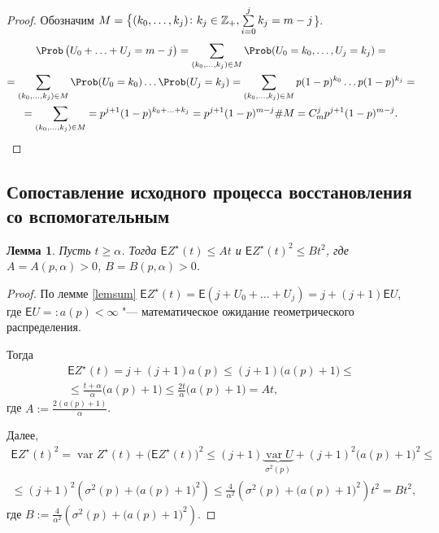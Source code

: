 \documentclass[a4paper]{article}
\newcommand{\Expect}{\mathsf{E}}
\newcommand{\nonneg}{\ensuremath\mathbb Z_+}
\DeclareMathOperator{\var}{\mathrm var}
\theoremstyle{plain}
\newtheorem{lem}[thm]{Лемма}
\theoremstyle{definition}
\theoremstyle{remark}
\begin{document}
\begin{proof}
   Обозначим $M = \big\{ (k_0, \ldots, k_j)\colon k_j \in \nonneg, \sum\limits_{i = 0}^j k_j = m - j$\big\}.
  \begin{multline*}
    \Prob\left( U_0 + \ldots + U_j = m - j\right) = \sum_{(k_0, \ldots, k_j) \in M} \Prob(U_0 = k_0, \ldots, U_j = k_j) =\\
    = \sum_{(k_0, \ldots, k_j) \in M} \Prob(U_0 = k_0)\ldots \Prob(U_j = k_j) = \sum_{(k_0, \ldots, k_j) \in M} p (1 - p)^{k_0}\ldots p (1 - p)^{k_j} =\\
    = \sum_{(k_0, \ldots, k_j) \in M} = p^{j + 1} (1 - p)^{k_0 + \ldots + k_j} = p^{j + 1} (1 - p)^{m - j} \#M = C_m^j p^{j + 1} (1 - p)^{m - j}.
  \end{multline*}
\end{proof}

\subsection{Сопоставление исходного процесса восстановления со вспомогательным}

\begin{lem}\label{est}
  Пусть $t \geqslant \alpha$. Тогда $\Expect Z^\star(t) \leqslant At$ и $\Expect Z^\star(t)^2 \leqslant B t^2$, где $A = A(p, \alpha) > 0$, $B = B(p, \alpha) > 0$.
\end{lem}

\begin{proof}
  По лемме \ref{lemsum} $\Expect Z^\star(t) = \Expect(j + U_0 + \ldots + U_j) = j + (j + 1) \Expect U$, где $\Expect U =: a(p) < \infty$ "--- математическое ожидание геометрического распределения.

  Тогда
  \begin{multline*}
    \Expect Z^\star(t) = j + (j + 1) a(p) \leqslant (j + 1) \big(a(p) + 1\big) \leqslant\\
    \leqslant \frac{t + \alpha}{\alpha} \big(a(p) + 1\big) \leqslant \frac{2 t}{\alpha} \big( a(p) + 1 \big) = A t,
  \end{multline*}
  где $A := \frac{2 (a(p) + 1)}{\alpha}$.

  Далее,
  \begin{multline*}
    \Expect Z^\star(t)^2 = \var Z^\star(t) + \big(\Expect Z^\star(t) \big)^2 \leqslant (j + 1) \underbrace{\var U}_{\sigma^2(p)} + (j + 1)^2 \big( a(p) + 1 \big)^2 \leqslant\\
    \leqslant (j + 1)^2 \left( \sigma^2(p) + \big( a(p) + 1 \big)^2 \right) \leqslant \frac{4}{\alpha^2} \left( \sigma^2(p) + \big( a(p) + 1 \big)^2 \right) t^2 = B t^2,
  \end{multline*}
  где $B := \frac{4}{\alpha^2} \left( \sigma^2(p) + \big( a(p) + 1 \big)^2 \right)$.
\end{proof}
\end{document}
